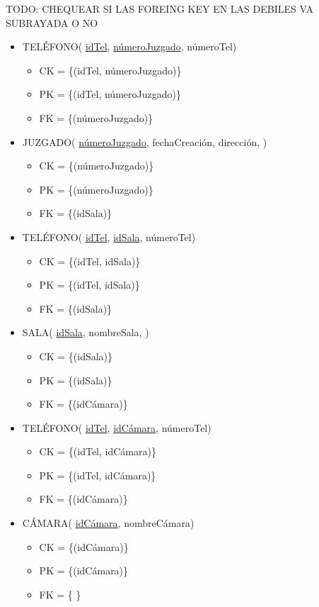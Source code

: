 TODO: CHEQUEAR SI LAS FOREING KEY EN LAS DEBILES VA SUBRAYADA O NO \\
\begin{itemize}

\item TELÉFONO( \underline{idTel}, \underline{númeroJuzgado}, númeroTel) 
	\begin{itemize}
		\item CK = \{(idTel, númeroJuzgado)\}
		\item PK = \{(idTel, númeroJuzgado)\}
		\item FK = \{(númeroJuzgado)\}
	\end{itemize}
	
\item JUZGADO( \underline{númeroJuzgado}, fechaCreación, dirección, )
	\begin{itemize}
		\item CK = \{(númeroJuzgado)\}
		\item PK = \{(númeroJuzgado)\}
		\item FK = \{(idSala)\}
	\end{itemize}

\item TELÉFONO( \underline{idTel}, \underline{idSala}, númeroTel) 
	\begin{itemize}
		\item CK = \{(idTel, idSala)\}
		\item PK = \{(idTel, idSala)\}
		\item FK = \{(idSala)\}
	\end{itemize}
\item SALA( \underline{idSala}, nombreSala, )
	\begin{itemize}
		\item CK = \{(idSala)\}
		\item PK = \{(idSala)\}
		\item FK = \{(idCámara)\}
	\end{itemize}
	
\item TELÉFONO( \underline{idTel}, \underline{idCámara}, númeroTel) 
	\begin{itemize}
		\item CK = \{(idTel, idCámara)\}
		\item PK = \{(idTel, idCámara)\}
		\item FK = \{(idCámara)\}
	\end{itemize}
\item CÁMARA( \underline{idCámara}, nombreCámara)
	\begin{itemize}
		\item CK = \{(idCámara)\}
		\item PK = \{(idCámara)\}
		\item FK = \{ \}
	\end{itemize}
		

\end{itemize}
